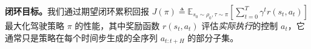 \documentclass{article}
\begin{document}


\noindent \textbf{闭环目标。}我们通过期望闭环累积回报 $J(\pi) \triangleq \mathbb{E}_{s_0 \sim \rho_0, \tau \sim \pi} \left[ \sum_{t=0}^{T} \gamma^{t} r(s_t, a_t) \right]$ 最大化驾驶策略 $\pi$ 的性能，其中奖励函数 $r(s_t, a_t)$ 评估\textit{实际执行}的控制 $a_t$，它通常只是策略在每个时间步生成的全序列 $a_{t:t+H}$ 的部分子集。

\end{document}
